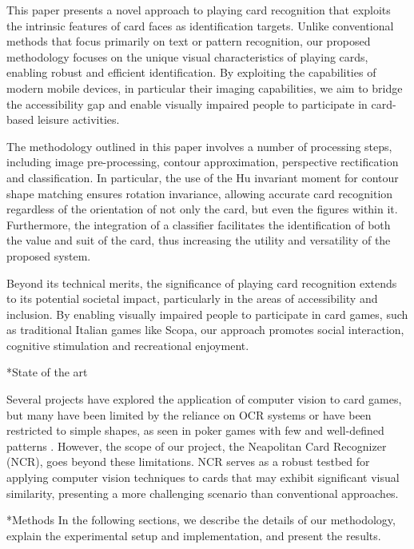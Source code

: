 \documentclass[twocolumn, a4paper,10pt]{article}
\makeatletter
\renewcommand\section{\@startsection{section}{1}{\z@}{3pt}{3pt}{\normalfont\large\bfseries}}
\renewcommand\subsection{\@startsection{subsection}{1}{\z@}{\z@}{\z@}{\normalfont\normalsize\bfseries}}
\renewcommand\subsection{\@startsection{subsection}{1}{\z@}{\z@}{0.1pt}{\normalfont\normalsize\bfseries}}
\makeatother
\begin{document}
This paper presents a novel approach to playing card recognition that exploits the intrinsic features of card faces as identification targets. Unlike conventional methods that focus primarily on text or pattern recognition, our proposed methodology focuses on the unique visual characteristics of playing cards, enabling robust and efficient identification. By exploiting the capabilities of modern mobile devices, in particular their imaging capabilities, we aim to bridge the accessibility gap and enable visually impaired people to participate in card-based leisure activities.

The methodology outlined in this paper involves a number of processing steps, including image pre-processing, contour approximation, perspective rectification and classification. In particular, the use of the Hu invariant moment for contour shape matching ensures rotation invariance, allowing accurate card recognition regardless of the orientation of not only the card, but even the figures within it. Furthermore, the integration of a classifier facilitates the identification of both the value and suit of the card, thus increasing the utility and versatility of the proposed system.

Beyond its technical merits, the significance of playing card recognition extends to its potential societal impact, particularly in the areas of accessibility and inclusion. By enabling visually impaired people to participate in card games, such as traditional Italian games like Scopa, our approach promotes social interaction, cognitive stimulation and recreational enjoyment.

\subsection*{State of the art}

Several projects have explored the application of computer vision to card games, but many have been limited by the reliance on OCR systems \citet{7972274} or have been restricted to simple shapes, as seen in poker games with few and well-defined patterns \citet{9563607}. However, the scope of our project, the Neapolitan Card Recognizer (NCR), goes beyond these limitations. NCR serves as a robust testbed for applying computer vision techniques to cards that may exhibit significant visual similarity, presenting a more challenging scenario than conventional approaches.

\section*{Methods}
In the following sections, we describe the details of our methodology, explain the experimental setup and implementation, and present the results.
\end{document}
